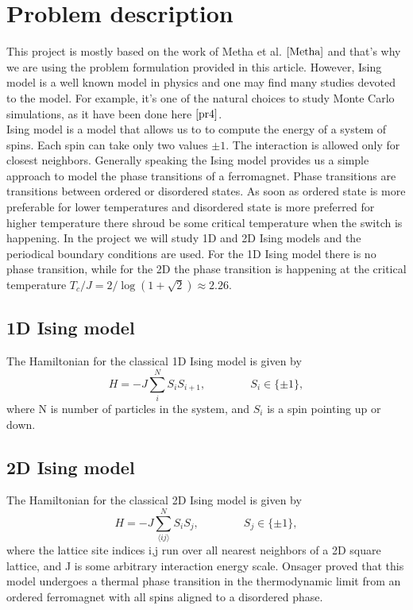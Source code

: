 \documentclass[10pt]{article}
\begin{document}
\section{Problem description}
This project is mostly based on the work of Metha et al. $\cite{Metha}$ and that's why we are using the problem formulation provided in this article. However, Ising model is a well known model in physics and one may find many studies devoted to the model. For example, it's one of the natural choices to study Monte Carlo simulations, as it have been done here $\cite{pr4}$.\\
Ising model is a model that allows us to to compute the energy of a system of spins. Each spin can take only two values $\pm1$. The interaction is allowed only for closest neighbors. Generally speaking the Ising model provides us a simple approach to model the phase transitions of a ferromagnet. Phase transitions are transitions between ordered or disordered states. As soon as ordered state is more preferable for lower temperatures and disordered state is more preferred for higher temperature there shroud be some critical temperature when the switch is happening. In the project we will study 1D and 2D Ising models and the periodical boundary conditions are used. For the 1D Ising model there is no phase transition, while for the 2D the phase transition is happening at the critical temperature  $T_c/J=2/\log(1+\sqrt{2})\approx 2.26$. 
\subsection{1D Ising model}
The Hamiltonian for the classical 1D Ising model is given by
\begin{equation}
H = -J\sum_{i}^N S_{i}S_{i+1},\qquad \qquad S_i\in\{\pm 1\},
\end{equation}
where N is number of particles in the system, and $S_i$ is a spin pointing up or down. \\

\subsection{2D Ising model}
The Hamiltonian for the classical 2D Ising model is given by
\begin{equation}
H = -J\sum_{\langle ij\rangle}^N S_{i}S_j,\qquad \qquad S_j\in\{\pm 1\},
\end{equation}
where the lattice site indices i,j run over all nearest neighbors of a 2D square lattice, and J is some arbitrary interaction energy scale. Onsager proved that this model undergoes a thermal phase transition in the thermodynamic limit from an ordered ferromagnet with all spins aligned to a disordered phase. \\
\end{document}
